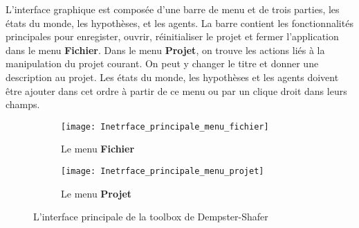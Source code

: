 L'interface graphique est composée d'une barre de menu et de trois parties, les états
du monde, les hypothèses, et les agents. La barre contient les fonctionnalités principales
pour enregister, ouvrir, réinitialiser le projet et fermer l'application dans le menu
\textbf{Fichier}. Dans le menu \textbf{Projet}, on trouve les actions liés à la manipulation
du projet courant. On peut y changer le titre et donner une description au projet. Les états
du monde, les hypothèses et les agents doivent être ajouter dans cet ordre à partir de ce
menu ou par un clique droit dans leurs champs.
\begin{figure}[h!]
\begin{subfigure}{0.49\textwidth}
\texttt{[image: Inetrface\_principale\_menu\_fichier]}
\caption{Le menu \textbf{Fichier}}
\end{subfigure}
\hfill
\begin{subfigure}{0.49\textwidth}
\texttt{[image: Inetrface\_principale\_menu\_projet]}
\caption{Le menu \textbf{Projet}}
\end{subfigure}
\caption{L'interface principale de la toolbox de Dempster-Shafer}
\end{figure}